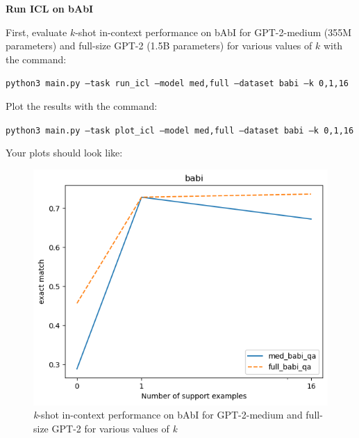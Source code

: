 \item {} {\bf Run ICL on bAbI}

First, evaluate $k$-shot in-context performance on bAbI for GPT-2-medium (355M parameters) and full-size GPT-2 (1.5B parameters) for various values of $k$ with the command:
    
\texttt{\small python3 main.py --task run\_icl --model med,full --dataset babi --k 0,1,16}

Plot the results with the command:

\texttt{\small python3 main.py --task plot\_icl --model med,full --dataset babi --k 0,1,16}

Your plots should look like:
\begin{figure}[H]
    \centering
    \includegraphics[width=0.75\linewidth]{./figures/q2_babi_plot}
    \caption{\textit{k}-shot in-context performance on bAbI for GPT-2-medium and full-size GPT-2 for various values of \textit{k}}
\end{figure}
